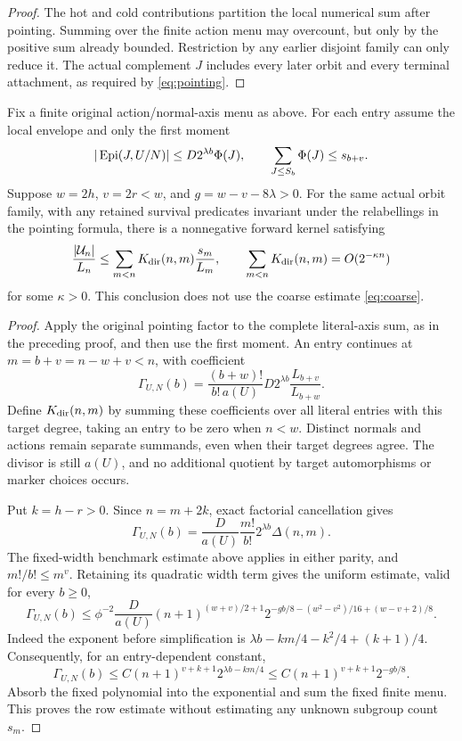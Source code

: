 \begin{proof}
The hot and cold contributions partition the local numerical sum
after pointing. Summing over the finite action menu may overcount,
but only by the positive sum already bounded. Restriction by any
earlier disjoint family can only reduce it. The actual complement
$J$ includes every later orbit and every terminal attachment, as
required by \eqref{eq:pointing}.
\end{proof}

\begin{proposition}\label{prop:direct-first-moment-fusion}
Fix a finite original action/normal-axis menu as above. For each entry
assume the local envelope and only the first moment
\[
 |\operatorname{Epi}(J,U/N)|\leq D2^{\lambda b}\Phi(J),\qquad
 \sum_{J\leq S_b}\Phi(J)\leq s_{b+v}.
\]
Suppose $w=2h$, $v=2r<w$, and $g=w-v-8\lambda>0$.
For the same actual orbit family, with any retained survival predicates
invariant under the relabellings in the pointing formula, there is a
nonnegative forward kernel satisfying
\[
 \frac{|\mathcal U_n|}{L_n}
 \leq\sum_{m<n}K_{\rm dir}(n,m)\frac{s_m}{L_m},\qquad
 \sum_{m<n}K_{\rm dir}(n,m)=O(2^{-\kappa n})
\]
for some $\kappa>0$. This conclusion does not use the coarse estimate
\eqref{eq:coarse}.
\end{proposition}
\begin{proof}
Apply the original pointing factor to the complete literal-axis sum,
as in the preceding proof, and then use the first moment. An entry
continues at $m=b+v=n-w+v<n$, with coefficient
\[
 \Gamma_{U,N}(b)=
 \frac{(b+w)!}{b!\,a(U)}D2^{\lambda b}
 \frac{L_{b+v}}{L_{b+w}}.
\]
Define $K_{\rm dir}(n,m)$ by summing these coefficients over all
literal entries with this target degree, taking an entry to be zero
when $n<w$. Distinct normals and actions
remain separate summands, even when their target degrees agree.
The divisor is still $a(U)$, and no additional quotient by target
automorphisms or marker choices occurs.

Put $k=h-r>0$. Since $n=m+2k$, exact factorial cancellation gives
\[
 \Gamma_{U,N}(b)
 =\frac{D}{a(U)}\frac{m!}{b!}2^{\lambda b}\Delta(n,m).
\]
The fixed-width benchmark estimate above applies in either parity,
and $m!/b!\leq m^v$. Retaining its quadratic width term gives the
uniform estimate, valid for every $b\geq0$,
\begin{equation}\label{eq:direct-uniform-coefficient}
 \Gamma_{U,N}(b)
 \leq \phi^{-2}\frac{D}{a(U)}(n+1)^{(w+v)/2+1}
 2^{-gb/8-(w^2-v^2)/16+(w-v+2)/8}.
\end{equation}
Indeed the exponent before simplification is
$\lambda b-km/4-k^2/4+(k+1)/4$.
Consequently, for an entry-dependent constant,
\[
 \Gamma_{U,N}(b)
 \leq C(n+1)^{v+k+1}2^{\lambda b-km/4}
 \leq C(n+1)^{v+k+1}2^{-gb/8}.
\]
Absorb the fixed polynomial into the exponential and sum the fixed
finite menu. This proves the row estimate without estimating any
unknown subgroup count $s_m$.
\end{proof}
